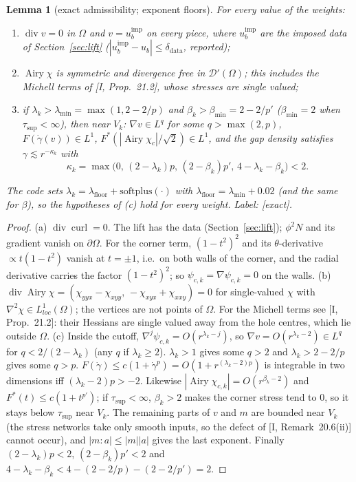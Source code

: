 \documentclass[11pt]{article}
\newtheorem{lemma}[theorem]{Lemma}
\theoremstyle{definition}
\newcommand{\gd}{\dot\gamma}
\newcommand{\Airy}{\operatorname{Airy}}
\begin{document}
\begin{lemma}[exact admissibility; exponent floors]\label{lem:adm}
For every value of the weights:
\begin{enumerate}[label=(\alph*)]
\item $\operatorname{div}v=0$ in $\Omega$ and $v=u_b^{\mathrm{imp}}$ on every piece, where $u_b^{\mathrm{imp}}$ are the imposed data of
Section~\ref{sec:lift} ($|u_b^{\mathrm{imp}}-u_b|\le\delta_{\mathrm{data}}$, reported);
\item $\Airy\chi$ is symmetric and divergence free in $\mathcal D'(\Omega)$; this includes the Michell terms
of [I, Prop.~21.2], whose stresses are single valued;
\item if $\lambda_k>\lambda_{\min}=\max(1,2-2/p)$ and $\beta_k>\beta_{\min}=2-2/p'$ ($\beta_{\min}=2$ when
$\tau_{\sup}<\infty$), then near $V_k$: $\nabla v\in L^q$ for some $q>\max(2,p)$, $F(\gd(v))\in L^1$,
$F^*(|\Airy\chi_c|/\sqrt2)\in L^1$, and the gap density satisfies $\gamma\lesssim r^{-\kappa_k}$ with
\[
\kappa_k=\max\big(0,\,(2-\lambda_k)p,\,(2-\beta_k)p',\,4-\lambda_k-\beta_k\big)<2 .
\]
\end{enumerate}
The code sets $\lambda_k=\lambda_{\mathrm{floor}}+\mathrm{softplus}(\cdot)$ with $\lambda_{\mathrm{floor}}=\lambda_{\min}+0.02$ (and the
same for $\beta$), so the hypotheses of (c) hold for every weight. Label: [exact].
\end{lemma}
\begin{proof}
(a) $\operatorname{div}\operatorname{curl}=0$. The lift has the data (Section~\ref{sec:lift}); $\phi^2N$ and its
gradient vanish on $\partial\Omega$. For the corner term, $(1-t^2)^2$ and its $\theta$-derivative
$\propto t(1-t^2)$ vanish at $t=\pm1$, i.e.\ on both walls of the corner, and the radial derivative carries the
factor $(1-t^2)^2$; so $\psi_{c,k}=\nabla\psi_{c,k}=0$ on the walls.
(b) $\operatorname{div}\Airy\chi=(\chi_{yyx}-\chi_{xyy},\,-\chi_{xyx}+\chi_{xxy})=0$ for single-valued $\chi$ with
$\nabla^2\chi\in L^1_{loc}(\Omega)$; the vertices are not points of $\Omega$. For the Michell terms see
[I, Prop.~21.2]: their Hessians are single valued away from the hole centres, which lie outside $\Omega$.
(c) Inside the cutoff, $\nabla^j\psi_{c,k}=O(r^{\lambda_k-j})$, so $\nabla v=O(r^{\lambda_k-2})\in L^q$ for
$q<2/(2-\lambda_k)$ (any $q$ if $\lambda_k\ge2$). $\lambda_k>1$ gives some $q>2$ and $\lambda_k>2-2/p$ gives some $q>p$.
$F(\gd)\le c(1+\gd^p)=O(1+r^{(\lambda_k-2)p})$ is integrable in two dimensions iff $(\lambda_k-2)p>-2$. Likewise
$|\Airy\chi_{c,k}|=O(r^{\beta_k-2})$ and $F^*(t)\le c(1+t^{p'})$; if $\tau_{\sup}<\infty$, $\beta_k>2$ makes the corner
stress tend to $0$, so it stays below $\tau_{\sup}$ near $V_k$. The remaining parts of $v$ and $m$ are bounded near
$V_k$ (the stress networks take only smooth inputs, so the defect of [I, Remark~20.6(ii)] cannot occur), and
$|m:a|\le|m||a|$ gives the last exponent. Finally $(2-\lambda_k)p<2$, $(2-\beta_k)p'<2$ and
$4-\lambda_k-\beta_k<4-(2-2/p)-(2-2/p')=2$.
\end{proof}
\end{document}
